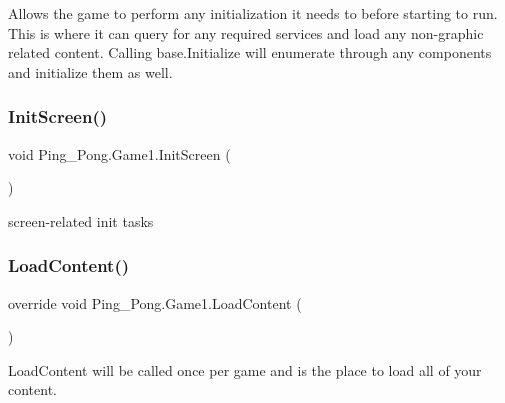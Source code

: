 Allows the game to perform any initialization it needs to before starting to run. This is where it can query for any required services and load any non-\/graphic related content. Calling base.\+Initialize will enumerate through any components and initialize them as well. 

\mbox{\label{class_ping___pong_1_1_game1_a06c80c174c822247fb58b9ce3d6c18b2}} 
\subsubsection{\texorpdfstring{Init\+Screen()}{InitScreen()}}
{\footnotesize\ttfamily void Ping\+\_\+\+Pong.\+Game1.\+Init\+Screen (\begin{DoxyParamCaption}{ }\end{DoxyParamCaption})}



screen-\/related init tasks 

\mbox{\label{class_ping___pong_1_1_game1_a6d3747853eb20dd83968478792b1a19d}} 
\subsubsection{\texorpdfstring{Load\+Content()}{LoadContent()}}
{\footnotesize\ttfamily override void Ping\+\_\+\+Pong.\+Game1.\+Load\+Content (\begin{DoxyParamCaption}{ }\end{DoxyParamCaption})\hspace{0.3cm}{\ttfamily [protected]}}



Load\+Content will be called once per game and is the place to load all of your content. 

\mbox{\label{class_ping___pong_1_1_game1_ac022f03857d45e8396e520c70eceb9c5}} 
